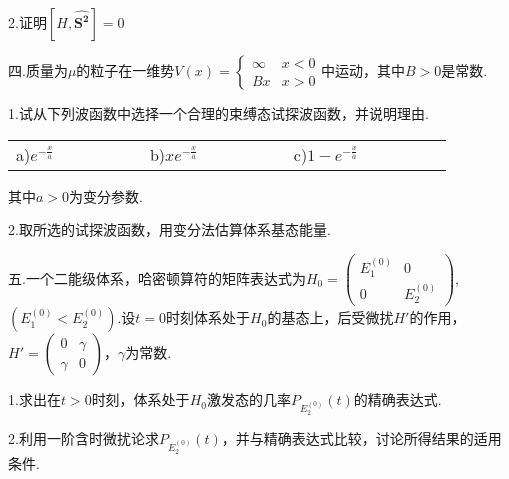 \documentclass[UTF8]{ctexart}
\begin{document}
2.证明$\left[H,\boldsymbol{\hat{S^{2}}}\right]=0$

\noindent 四.质量为$\mu$的粒子在一维势$V\left(x\right)=\begin{cases}
\infty & x<0\\
Bx & x>0
\end{cases}$中运动，其中$B>0$是常数.

1.试从下列波函数中选择一个合理的束缚态试探波函数，并说明理由.

\begin{tabular}{cccccccccccccccccc}
a)$e^{-\frac{x}{a}}$ &  &  &  &  &  & b)$xe^{-\frac{x}{a}}$ &  &  &  &  &  & c)$1-e^{-\frac{x}{a}}$ &  &  &  &  & \\
\end{tabular}

其中$a>0$为变分参数.

2.取所选的试探波函数，用变分法估算体系基态能量.

\noindent 五.一个二能级体系，哈密顿算符的矩阵表达式为$H_{0}=\left(\begin{array}{cc}
E_{1}^{\left(0\right)} & 0\\
0 &
E_{2}^{\left(0\right)}\end{array}\right)$,$\left(E_{1}^{\left(0\right)}<E_{2}^{\left(0\right)}\right)$.设$t=0$时刻体系处于$H_0$的基态上，后受微扰$H'$的作用，$H'=\left(\begin{array}{cc}
0 & \gamma\\
\gamma & 0
\end{array}\right)$，$\gamma$为常数.

1.求出在$t>0$时刻，体系处于$H_{0}$激发态的几率$P_{E_{2}^{\left(0\right)}}\left(t\right)$的精确表达式.

2.利用一阶含时微扰论求$P_{E_{2}^{\left(0\right)}}\left(t\right)$，并与精确表达式比较，讨论所得结果的适用条件.

\thispagestyle{empty}
\end{document}
